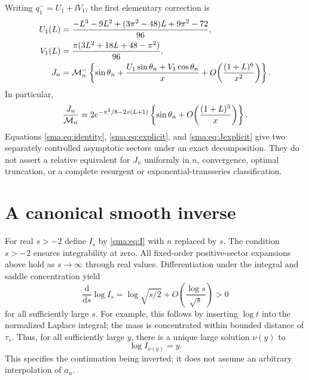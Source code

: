 \documentclass[11pt,letterpaper]{article}
\numberwithin{equation}{section}
\begin{document}
Writing $q_1^-=U_1+\ii V_1$, the first elementary correction is
\begin{align}
 U_1(L)&=\frac{-L^3-9L^2+(3\pi^2-48)L+9\pi^2-72}{96},\notag\\
 V_1(L)&=\frac{\pi(3L^2+18L+48-\pi^2)}{96},\label{sma:eq:Jpoly1}\\
 J_n&=\mathcal M_n^-\left\{\sin\theta_n+\frac{U_1\sin\theta_n+V_1\cos\theta_n}{x}
 +O\!\left(\frac{(1+L)^6}{x^2}\right)\right\}.\notag
\end{align}
In particular,
\begin{equation}\label{sma:eq:JrelativeM}
 \frac{J_n}{\mathcal M_n}=2e^{-\pi^2/8-2x(L+1)}
 \left\{\sin\theta_n+O\!\left(\frac{(1+L)^3}{x}\right)\right\}.
\end{equation}
Equations \eqref{sma:eq:identity}, \eqref{sma:eq:explicit}, and \eqref{sma:eq:Jexplicit} give two separately controlled asymptotic sectors under an exact decomposition. They do not assert a relative equivalent for $J_n$ uniformly in $n$, convergence, optimal truncation, or a complete resurgent or exponential-transseries classification.

\section{A canonical smooth inverse}
For real $s>-2$ define $I_s$ by \eqref{sma:eq:I} with $n$ replaced by $s$. The condition $s>-2$ ensures integrability at zero. All fixed-order positive-sector expansions above hold as $s\to\infty$ through real values.
Differentiation under the integral and saddle concentration yield
\begin{equation}\label{sma:eq:derivativeinverse}
 \frac{\mathrm d}{\mathrm ds}\log I_s
 =\log\sqrt{s/2}+O\!\left(\frac{\log s}{\sqrt s}\right)>0
\end{equation}
for all sufficiently large $s$. For example, this follows by inserting $\log t$ into the normalized Laplace integral; the mass is concentrated within bounded distance of $\tau_s$. Thus, for all sufficiently large $y$, there is a unique large solution $\nu(y)$ to
\begin{equation}\label{sma:eq:nudef}
 \log I_{\nu(y)}=y.
\end{equation}
This specifies the continuation being inverted; it does not assume an arbitrary interpolation of $a_n$.
\end{document}
